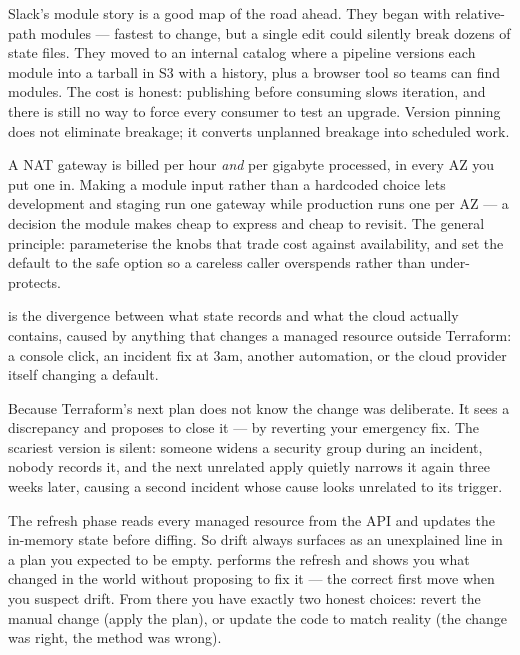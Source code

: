 \begin{scalenote}
Slack's module story is a good map of the road ahead. They began with relative-path modules --- fastest to change, but a single edit could silently break dozens of state files. They moved to an internal catalog where a pipeline versions each module into a tarball in S3 with a  history, plus a browser tool so teams can find modules. The cost is honest: publishing before consuming slows iteration, and there is still no way to force every consumer to test an upgrade. Version pinning does not eliminate breakage; it converts unplanned breakage into scheduled work.
\end{scalenote}

\begin{costnote}
A NAT gateway is billed per hour \emph{and} per gigabyte processed, in every AZ you put one in. Making  a module input rather than a hardcoded choice lets development and staging run one gateway while production runs one per AZ --- a decision the module makes cheap to express and cheap to revisit. The general principle: parameterise the knobs that trade cost against availability, and set the default to the safe option so a careless caller overspends rather than under-protects.
\end{costnote}


  is the divergence between what state records and what the cloud actually contains, caused by anything that changes a managed resource outside Terraform: a console click, an incident fix at 3am, another automation, or the cloud provider itself changing a default.

 Because Terraform's next plan does not know the change was deliberate. It sees a discrepancy and proposes to close it --- by reverting your emergency fix. The scariest version is silent: someone widens a security group during an incident, nobody records it, and the next unrelated apply quietly narrows it again three weeks later, causing a second incident whose cause looks unrelated to its trigger.

 The refresh phase reads every managed resource from the API and updates the in-memory state before diffing. So drift always surfaces as an unexplained \code{\textasciitilde{}} line in a plan you expected to be empty.  performs the refresh and shows you what changed in the world without proposing to fix it --- the correct first move when you suspect drift. From there you have exactly two honest choices: revert the manual change (apply the plan), or update the code to match reality (the change was right, the method was wrong).

